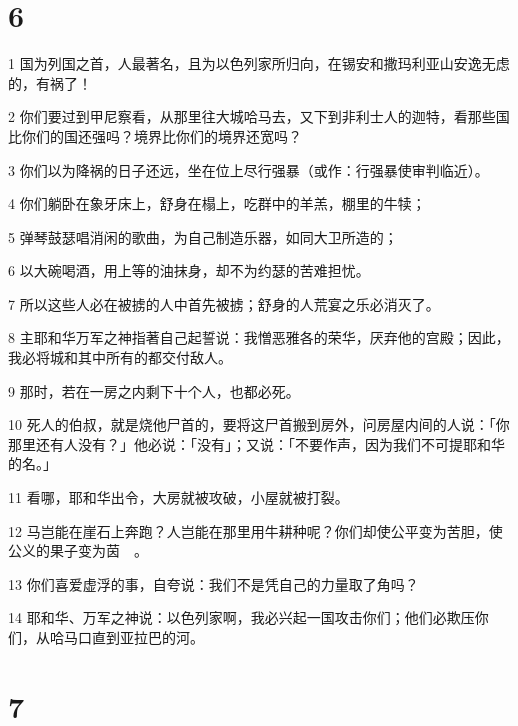 \chapter{6}

\par 1 国为列国之首，人最著名，且为以色列家所归向，在锡安和撒玛利亚山安逸无虑的，有祸了！
\par 2 你们要过到甲尼察看，从那里往大城哈马去，又下到非利士人的迦特，看那些国比你们的国还强吗？境界比你们的境界还宽吗？
\par 3 你们以为降祸的日子还远，坐在位上尽行强暴（或作：行强暴使审判临近）。
\par 4 你们躺卧在象牙床上，舒身在榻上，吃群中的羊羔，棚里的牛犊；
\par 5 弹琴鼓瑟唱消闲的歌曲，为自己制造乐器，如同大卫所造的；
\par 6 以大碗喝酒，用上等的油抹身，却不为约瑟的苦难担忧。
\par 7 所以这些人必在被掳的人中首先被掳；舒身的人荒宴之乐必消灭了。
\par 8 主耶和华万军之神指著自己起誓说：我憎恶雅各的荣华，厌弃他的宫殿；因此，我必将城和其中所有的都交付敌人。
\par 9 那时，若在一房之内剩下十个人，也都必死。
\par 10 死人的伯叔，就是烧他尸首的，要将这尸首搬到房外，问房屋内间的人说：「你那里还有人没有？」他必说：「没有」；又说：「不要作声，因为我们不可提耶和华的名。」
\par 11 看哪，耶和华出令，大房就被攻破，小屋就被打裂。
\par 12 马岂能在崖石上奔跑？人岂能在那里用牛耕种呢？你们却使公平变为苦胆，使公义的果子变为茵　。
\par 13 你们喜爱虚浮的事，自夸说：我们不是凭自己的力量取了角吗？
\par 14 耶和华、万军之神说：以色列家啊，我必兴起一国攻击你们；他们必欺压你们，从哈马口直到亚拉巴的河。

\chapter{7}

